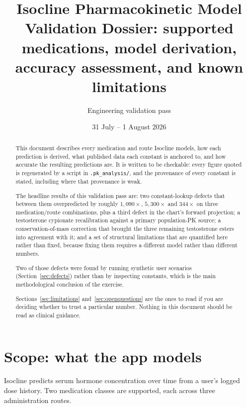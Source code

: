 \documentclass[11pt,a4paper]{article}
\title{\textbf{Isocline Pharmacokinetic Model}\\[0.3em]
       \large Validation Dossier: supported medications, model derivation,\\
       accuracy assessment, and known limitations}
\author{Engineering validation pass}
\date{31 July -- 1 August 2026}
\newcommand{\code}[1]{\texttt{\small #1}}
\begin{document}
\maketitle

\begin{abstract}
\noindent
This document describes every medication and route Isocline models, how each
prediction is derived, what published data each constant is anchored to, and how
accurate the resulting predictions are. It is written to be checkable: every
figure quoted is regenerated by a script in \code{.pk\_analysis/}, and the
provenance of every constant is stated, including where that provenance is weak.

The headline results of this validation pass are: two constant-lookup defects that
between them overpredicted by roughly $1{,}090\times$, $5{,}300\times$ and
$344\times$ on three medication/route combinations, plus a third defect in the
chart's forward projection; a testosterone cypionate recalibration against a
primary population-PK source; a conservation-of-mass correction that brought the
three remaining testosterone esters into agreement with it; and a set of
structural limitations that are quantified here rather than fixed, because fixing
them requires a different model rather than different numbers.

Two of those defects were found by running synthetic user scenarios
(Section~\ref{sec:defects}) rather than by inspecting constants, which is the main
methodological conclusion of the exercise.

Sections~\ref{sec:limitations} and~\ref{sec:openquestions} are the ones to read
if you are deciding whether to trust a particular number. Nothing in this document
should be read as clinical guidance.
\end{abstract}

\tableofcontents
\clearpage

\section{Scope: what the app models}

Isocline predicts serum hormone concentration over time from a user's logged dose
history. Two medication classes are supported, each across three administration
routes.
\end{document}
